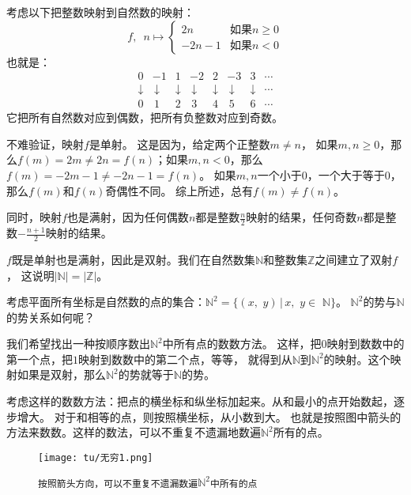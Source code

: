 \documentclass[12pt,UTF8]{ctexbook}
\begin{document}
考虑以下把整数映射到自然数的映射：
$$ f,\,\,\,n\mapsto \left\{
    \begin{array}{cl}
        2n & \mbox{如果}n \geqslant 0 \\
        -2n - 1  & \mbox{如果}n < 0 
    \end{array}\right.
$$
也就是：
$$ \begin{array}{cccccccc}
        0 & -1 & 1 & -2 & 2 & -3 & 3 & \cdots \\
        \downarrow & \,\downarrow & \downarrow & \,\downarrow & \downarrow & \,\downarrow & \downarrow & \cdots \\
        0 & \,1 & 2 & \,3 & 4 & \,5 & 6 & \cdots 
    \end{array}
$$
它把所有自然数对应到偶数，把所有负整数对应到奇数。

不难验证，映射$f$是单射。
这是因为，给定两个正整数$m \neq n$，
如果$m,n\geqslant 0$，那么$f(m) = 2m \neq 2n = f(n)$；如果$m,n< 0$，那么$f(m) = -2m - 1 \neq -2n - 1 = f(n)$。
如果$m,n$一个小于$0$，一个大于等于$0$，那么$f(m)$和$f(n)$奇偶性不同。
综上所述，总有$f(m) \neq f(n)$。

同时，映射$f$也是满射，因为任何偶数$n$都是整数$\frac{n}{2}$映射的结果，任何奇数$n$都是整数$-\frac{n+1}{2}$映射的结果。

$f$既是单射也是满射，因此是双射。我们在自然数集$\mathbb{N}$和整数集$\mathbb{Z}$之间建立了双射$f$，
这说明$|\mathbb{N}| = |\mathbb{Z}|$。

考虑平面所有坐标是自然数的点的集合：$\mathbb{N}^2 = \{(x,\,\,y) \, | \, x, \,\, y \in \,\, \mathbb{N}\}$。
$\mathbb{N}^2$的势与$\mathbb{N}$的势关系如何呢？

我们希望找出一种按顺序数出$\mathbb{N}^2$中所有点的数数方法。
这样，把$0$映射到数数中的第一个点，把$1$映射到数数中的第二个点，等等，
就得到从$\mathbb{N}$到$\mathbb{N}^2$的映射。这个映射如果是双射，那么$\mathbb{N}^2$的势就等于$\mathbb{N}$的势。

考虑这样的数数方法：把点的横坐标和纵坐标加起来。从和最小的点开始数起，逐步增大。
对于和相等的点，则按照横坐标，从小数到大。
也就是按照图中箭头的方法来数数。这样的数法，可以不重复不遗漏地数遍$\mathbb{N}^2$所有的点。

\begin{figure}[h] %
    \vspace{4pt}
    \centering
    \texttt{[image: tu/无穷1.png]}
    \caption*{\texttt{按照箭头方向，可以不重复不遗漏数遍}$\mathbb{N}^2$\texttt{中所有的点}}
\end{figure}
\end{document}
